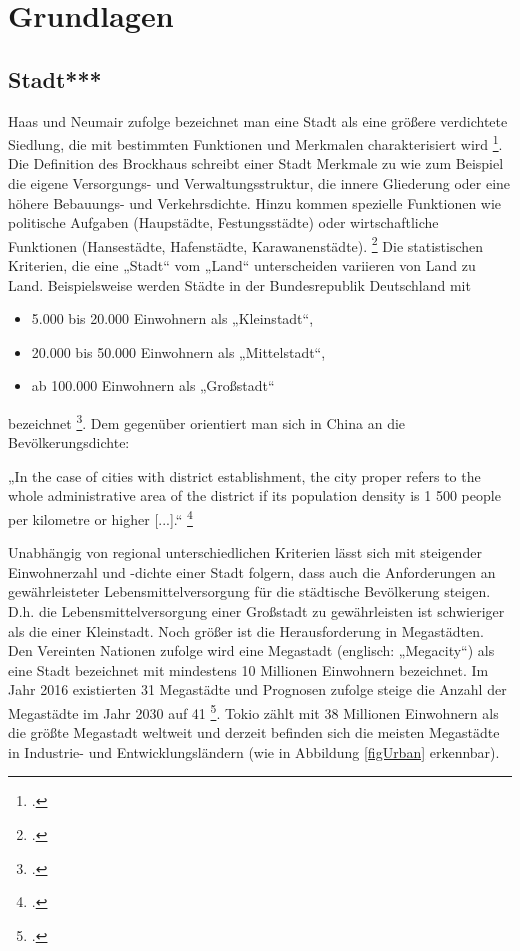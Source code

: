 \documentclass{scrartcl}
\begin{document}
\section{Grundlagen}

\subsection{Stadt***}

Haas und Neumair zufolge bezeichnet man eine Stadt als eine größere verdichtete Siedlung, die mit bestimmten Funktionen und Merkmalen charakterisiert wird \footcite{HaasDefinitionWirtschaftslexikon}. Die Definition des Brockhaus schreibt einer Stadt Merkmale zu wie zum Beispiel die eigene Versorgungs- und Verwaltungsstruktur, die innere Gliederung oder eine höhere Bebauungs- und Verkehrsdichte. Hinzu kommen spezielle Funktionen wie politische Aufgaben (Haupstädte, Festungsstädte) oder wirtschaftliche Funktionen (Hansestädte, Hafenstädte, Karawanenstädte). \footcite{BrockhausStadt} Die statistischen Kriterien, die eine „Stadt“ vom „Land“ unterscheiden variieren von Land zu Land. Beispielsweise werden Städte in der Bundesrepublik Deutschland mit 
\begin{itemize}
\item 5.000 bis 20.000 Einwohnern als „Kleinstadt“,
\item 20.000 bis 50.000 Einwohnern als „Mittelstadt“,
\item ab 100.000 Einwohnern als „Großstadt“ 
\end{itemize}
bezeichnet \footcite{Institutinternationaldestatistique1887BulletinStatistique}. Dem gegenüber orientiert man sich in China an die Bevölkerungsdichte: 

\begin{displayquote}
„In the case of cities with district establishment, the city proper refers to the whole administrative area of the district if its population density is 1 500 people per kilometre or higher [...].“ \footcite[S.~2]{UnitedNations2005Table2005} 
\end{displayquote}

Unabhängig von regional unterschiedlichen Kriterien lässt sich mit steigender Einwohnerzahl und -dichte einer Stadt folgern, dass auch die Anforderungen an gewährleisteter Lebensmittelversorgung für die städtische Bevölkerung steigen. D.h. die Lebensmittelversorgung einer Großstadt zu gewährleisten ist schwieriger als die einer Kleinstadt. Noch größer ist die Herausforderung in Megastädten. Den Vereinten Nationen zufolge wird eine Megastadt (englisch: „Megacity“) als eine Stadt bezeichnet mit mindestens 10 Millionen Einwohnern bezeichnet. Im Jahr 2016 existierten 31 Megastädte und Prognosen zufolge steige die Anzahl der Megastädte im Jahr 2030 auf 41 \footcite{UnitedNations2016The2016}. Tokio zählt mit 38 Millionen Einwohnern als die größte Megastadt weltweit und derzeit befinden sich die meisten Megastädte in Industrie- und Entwicklungsländern (wie in Abbildung \ref{figUrban} erkennbar). 
\end{document}
